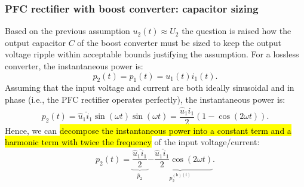 \begin{frame}
    \frametitle{PFC rectifier with boost converter: capacitor sizing}
    Based on the previous assumption $u_2(t)\approx U_2$ the question is raised how the output capacitor $C$ of the boost converter must be sized to keep the output voltage ripple within acceptable bounds justifying the assumption. For a lossless converter, the instantaneous power is:
    \begin{equation*}
        p_2(t) =p_1(t) = u_1(t)i_1(t).
    \end{equation*}\pause
    Assuming that the input voltage and  current are both ideally sinusoidal and in phase (i.e., the PFC rectifier operates perfectly), the instantaneous power is:
    \begin{equation}
        p_2(t) = \hat{u}_1\hat{i}_1\sin(\omega t)\sin(\omega t) = \frac{\hat{u}_1\hat{i}_1}{2}\left(1-\cos(2\omega t)\right).
    \end{equation}\pause
    Hence, we can \hl{decompose the instantaneous power into a constant term and a harmonic term with twice the frequency} of the input voltage/current:
    \begin{equation}
        p_2(t) = \underbrace{\frac{\hat{u}_1\hat{i}_1}{2}}_{\overline{p}_2} \underbrace{- \frac{\hat{u}_1\hat{i}_1}{2}\cos(2\omega t)}_{p_2^{(\mathrm{h})(t)}}.
    \end{equation}
\end{frame}

